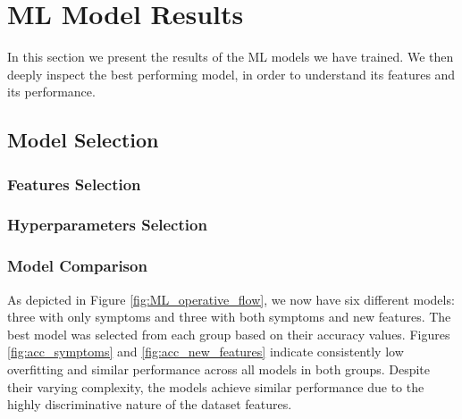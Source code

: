 \section{ML Model Results}
\label{sec:results_ML}
In this section we present the results of the ML models we have trained. We then deeply inspect the best performing model, 
in order to understand its features and its performance.



\subsection{Model Selection}
\label{subsec:results_ML_model_selection}

\subsubsection*{Features Selection}

\subsubsection*{Hyperparameters Selection}


	\subsubsection*{Model Comparison} \label{subsubsec:results_ML_model_comparison}

	As depicted in Figure \ref{fig:ML_operative_flow}, we now have six different models: three with only symptoms 
	and three with both symptoms and new features. The best model was selected from each group based on their accuracy 
	values. Figures \ref{fig:acc_symptoms} and \ref{fig:acc_new_features} indicate consistently low overfitting 
	and similar performance across all models in both groups. Despite their varying complexity, the models achieve 
	similar performance due to the highly discriminative nature of the dataset features.
	
